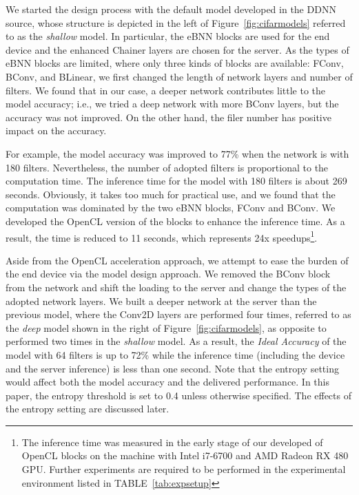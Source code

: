 \documentclass[conference]{IEEEtran}
\def\figurename{Figure}
\def\tablename{TABLE}
\begin{document}
We started the design process with the default model developed in the DDNN source, whose structure is depicted in the left of \figurename~\ref{fig:cifarmodels} referred to as the \emph{shallow} model. In particular, the eBNN blocks are used for the end device and the enhanced Chainer layers are chosen for the server. As the types of eBNN blocks are limited, where only three kinds of blocks are available: FConv, BConv, and BLinear, we first changed the length of network layers and number of filters. We found that in our case, a deeper network contributes little to the model accuracy; i.e., we tried a deep network with more BConv layers, but the accuracy was not improved. On the other hand, the filer number has positive impact on the accuracy.

For example, the model accuracy was improved to 77\% when the network is with 180 filters.
Nevertheless, the number of adopted filters is proportional to the computation time. The inference time for the model with 180 filters is about 269 seconds. Obviously, it takes too much for practical use, and we found that the computation was dominated by the two eBNN blocks, FConv and BConv. We developed the OpenCL version of the blocks to enhance the inference time. As a result, the time is reduced to 11 seconds, which represents 24x speedups\footnote{The inference time was measured in the early stage of our developed of OpenCL blocks on the machine with Intel i7-6700 and AMD Radeon RX 480 GPU. Further experiments are required to be performed in the experimental environment listed in \tablename~\ref{tab:expsetup}}.

Aside from the OpenCL acceleration approach, we attempt to ease the burden of the end device via the model design approach. We removed the BConv block from the network and shift the loading to the server and change the types of the adopted network layers. We built a deeper network at the server than the previous model, where the Conv2D layers are performed four times, referred to as the \emph{deep} model shown in the right of \figurename~\ref{fig:cifarmodels}, as opposite to performed two times in the \emph{shallow} model. As a result, the \emph{Ideal Accuracy} of the model with 64 filters is up to 72\% while the inference time (including the device and the server inference) is less than one second. Note that the entropy setting would affect both the model accuracy and the delivered performance. In this paper, the entropy threshold is set to 0.4 unless otherwise specified. The effects of the entropy setting are discussed later.
\end{document}
